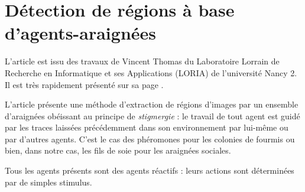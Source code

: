 \section{Détection de régions à base d'agents-araignées}


L'article \cite{spiders2} est issu des travaux de Vincent Thomas du Laboratoire Lorrain de Recherche en Informatique et ses Applications (LORIA) de l'université Nancy 2.
Il est très rapidement présenté sur sa page \cite{spiders1}.

L'article présente une méthode d'extraction de régions d'images par un ensemble d'araignées obéissant au principe de \emph{stigmergie} : le travail de tout agent est guidé par les traces laissées précédemment dans son environnement par lui-même ou par d'autres agents. C'est le cas des phéromones pour les colonies de fourmis ou bien, dans notre cas, les fils de soie pour les araignées sociales.

Tous les agents présents sont des agents réactifs : leurs actions sont déterminées par de simples stimulus. 

